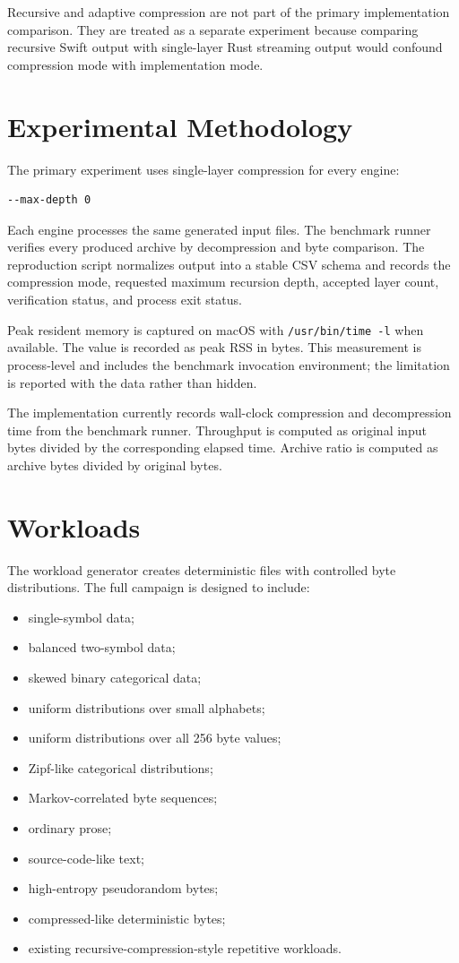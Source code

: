 \documentclass[conference]{IEEEtran}
\begin{document}
Recursive and adaptive compression are not part of the primary implementation comparison. They are treated as a separate experiment because comparing recursive Swift output with single-layer Rust streaming output would confound compression mode with implementation mode.

\section{Experimental Methodology}

The primary experiment uses single-layer compression for every engine:

\begin{verbatim}
--max-depth 0
\end{verbatim}

Each engine processes the same generated input files. The benchmark runner verifies every produced archive by decompression and byte comparison. The reproduction script normalizes output into a stable CSV schema and records the compression mode, requested maximum recursion depth, accepted layer count, verification status, and process exit status.

Peak resident memory is captured on macOS with \texttt{/usr/bin/time -l} when available. The value is recorded as peak RSS in bytes. This measurement is process-level and includes the benchmark invocation environment; the limitation is reported with the data rather than hidden.

The implementation currently records wall-clock compression and decompression time from the benchmark runner. Throughput is computed as original input bytes divided by the corresponding elapsed time. Archive ratio is computed as archive bytes divided by original bytes.

\section{Workloads}

The workload generator creates deterministic files with controlled byte distributions. The full campaign is designed to include:

\begin{itemize}
    \item single-symbol data;
    \item balanced two-symbol data;
    \item skewed binary categorical data;
    \item uniform distributions over small alphabets;
    \item uniform distributions over all 256 byte values;
    \item Zipf-like categorical distributions;
    \item Markov-correlated byte sequences;
    \item ordinary prose;
    \item source-code-like text;
    \item high-entropy pseudorandom bytes;
    \item compressed-like deterministic bytes;
    \item existing recursive-compression-style repetitive workloads.
\end{itemize}
\end{document}
